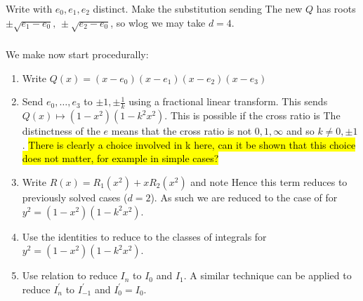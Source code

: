 \documentclass{article}
\begin{document}
\subsubsection{}
Write 
with $e_0,e_1,e_2$ distinct. Make the substitution 
sending 
The new $Q$ has roots $\pm \sqrt{e_1 - e_0}, \, \pm\sqrt{e_2 - e_0}$, so wlog we may take $d=4$.
\subsubsection{}
We make now start procedurally:
\begin{enumerate}
	\item Write $Q(x) = (x-e_0)(x-e_1)(x-e_2)(x-e_3)$
	\item Send $e_0, \dots, e_3$ to $\pm1, \pm \frac{1}{k}$ using a fractional linear transform. This sends $Q(x) \mapsto (1-x^2)(1-k^2 x^2)$. This is possible if the cross ratio is 
The distinctness of the $e$ means that the cross ratio is not $0,1,\infty$ and so $k \neq 0, \pm 1$. \hl{There is clearly a choice involved in k here, can it be shown that this choice does not matter, for example in simple cases?}
\item Write $R(x) = R_1(x^2) + xR_2(x^2)$ and note 
Hence this term reduces to previously solved cases ($d=2$). As such we are reduced to the case of
for $y^2 = (1-x^2)(1-k^2 x^2)$. 
\item Use the identities 
to reduce to the classes of integrals
for $y^2 = (1-x^2)(1-k^2 x^2)$.
\item Use relation 
to reduce $I_n$ to $I_0$ and $I_1$. A similar technique can be applied to reduce $I_n^\prime$ to $I_{-1}^\prime$ and $I_0^\prime=I_0$. 
\end{enumerate}
\end{document}
